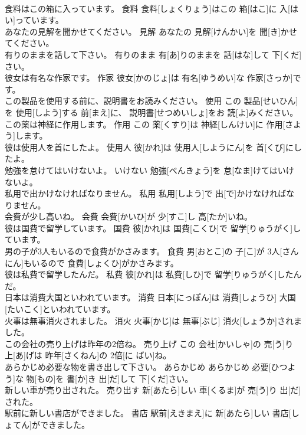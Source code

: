 \documentclass[8pt]{extreport}
\begin{document}
\begin{CJK}{UTF8}{min}
\\	食料はこの箱に入っています。	食料	食料[しょくりょう]はこの 箱[はこ]に 入[はい]っています。	
\\	あなたの見解を聞かせてください。	見解	あなたの 見解[けんかい]を 聞[き]かせてください。	
\\	有りのままを話して下さい。	有りのまま	有[あ]りのままを 話[はな]して 下[くだ]さい。	
\\	彼女は有名な作家です。	作家	彼女[かのじょ]は 有名[ゆうめい]な 作家[さっか]です。	
\\	この製品を使用する前に、説明書をお読みください。	使用	この 製品[せいひん]を 使用[しよう]する 前[まえ]に、 説明書[せつめいしょ]をお 読[よ]みください。	
\\	この薬は神経に作用します。	作用	この 薬[くすり]は 神経[しんけい]に 作用[さよう]します。	
\\	彼は使用人を首にしたよ。	使用人	彼[かれ]は 使用人[しようにん]を 首[くび]にしたよ。	
\\	勉強を怠けてはいけないよ。	いけない	勉強[べんきょう]を 怠[なま]けてはいけないよ。	
\\	私用で出かけなければなりません。	私用	私用[しよう]で 出[で]かけなければなりません。	
\\	会費が少し高いね。	会費	会費[かいひ]が 少[すこ]し 高[たか]いね。	
\\	彼は国費で留学しています。	国費	彼[かれ]は 国費[こくひ]で 留学[りゅうがく]しています。	
\\	男の子が3人もいるので食費がかさみます。	食費	男[おとこ]の 子[こ]が 3人[さんにん]もいるので 食費[しょくひ]がかさみます。	
\\	彼は私費で留学したんだ。	私費	彼[かれ]は 私費[しひ]で 留学[りゅうがく]したんだ。	
\\	日本は消費大国といわれています。	消費	日本[にっぽん]は 消費[しょうひ] 大国[たいこく]といわれています。	
\\	火事は無事消火されました。	消火	火事[かじ]は 無事[ぶじ] 消火[しょうか]されました。	
\\	この会社の売り上げは昨年の2倍ね。	売り上げ	この 会社[かいしゃ]の 売[う]り 上[あ]げは 昨年[さくねん]の 2倍[に ばい]ね。	
\\	あらかじめ必要な物を書き出して下さい。	あらかじめ	あらかじめ 必要[ひつよう]な 物[もの]を 書[か]き 出[だ]して 下[くだ]さい。	
\\	新しい車が売り出された。	売り出す	新[あたら]しい 車[くるま]が 売[う]り 出[だ]された。	
\\	駅前に新しい書店ができました。	書店	駅前[えきまえ]に 新[あたら]しい 書店[しょてん]ができました。	

\end{CJK}
\end{document}
